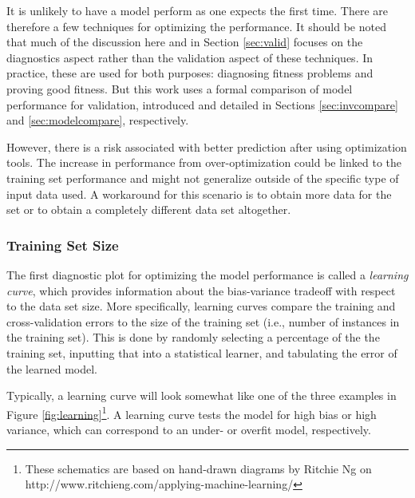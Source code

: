 It is unlikely to have a model perform as one expects the first time. There are
therefore a few techniques for optimizing the performance. It should be noted
that much of the discussion here and in Section \ref{sec:valid} focuses on the
diagnostics aspect rather than the validation aspect of these techniques. In
practice, these are used for both purposes: diagnosing fitness problems and
proving good fitness.  But this work uses a formal comparison of model
performance for validation, introduced and detailed in Sections
\ref{sec:invcompare} and \ref{sec:modelcompare}, respectively. 

However, there is a risk associated with better prediction after using
optimization tools.  The increase in performance from over-optimization could
be linked to the training set performance and might not generalize outside of
the specific type of input data used.  A workaround for this scenario is to
obtain more data for the set or to obtain a completely different data set
altogether. 

\subsubsection{Training Set Size}

The first diagnostic plot for optimizing the model performance is called a
\textit{learning curve}, which provides information about the bias-variance
tradeoff with respect to the data set size. More specifically, learning curves
compare the training and cross-validation errors to the size of the training
set (i.e., number of instances in the training set). This is done by randomly
selecting a percentage of the the training set, inputting that into a
statistical learner, and tabulating the error of the learned model. 

Typically, a learning curve will look somewhat like one of the three examples
in Figure \ref{fig:learning}\footnote{These schematics are based on hand-drawn
diagrams by Ritchie Ng on http://www.ritchieng.com/applying-machine-learning/}.
A learning curve tests the model for high bias or high variance, which can
correspond to an under- or overfit model, respectively. 

